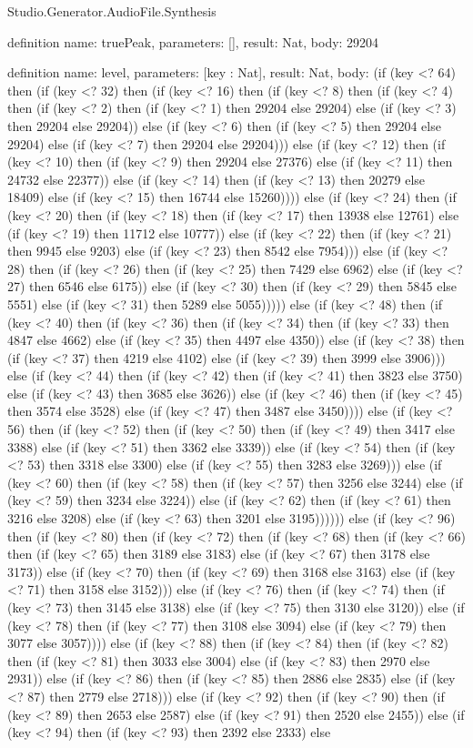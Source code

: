 \begin{lexlean}{Studio.Generator.AudioFile.Synthesis}
\begin{semanticmodule}
definition{
  name: truePeak,
  parameters: [],
  result: Nat,
  body: 29204
}

definition{
  name: level,
  parameters: [key : Nat],
  result: Nat,
  body: (if (key <? 64) then (if (key <? 32) then (if (key <? 16) then (if (key <? 8) then (if (key <? 4) then (if (key <? 2) then (if (key <? 1) then 29204 else 29204) else (if (key <? 3) then 29204 else 29204)) else (if (key <? 6) then (if (key <? 5) then 29204 else 29204) else (if (key <? 7) then 29204 else 29204))) else (if (key <? 12) then (if (key <? 10) then (if (key <? 9) then 29204 else 27376) else (if (key <? 11) then 24732 else 22377)) else (if (key <? 14) then (if (key <? 13) then 20279 else 18409) else (if (key <? 15) then 16744 else 15260)))) else (if (key <? 24) then (if (key <? 20) then (if (key <? 18) then (if (key <? 17) then 13938 else 12761) else (if (key <? 19) then 11712 else 10777)) else (if (key <? 22) then (if (key <? 21) then 9945 else 9203) else (if (key <? 23) then 8542 else 7954))) else (if (key <? 28) then (if (key <? 26) then (if (key <? 25) then 7429 else 6962) else (if (key <? 27) then 6546 else 6175)) else (if (key <? 30) then (if (key <? 29) then 5845 else 5551) else (if (key <? 31) then 5289 else 5055))))) else (if (key <? 48) then (if (key <? 40) then (if (key <? 36) then (if (key <? 34) then (if (key <? 33) then 4847 else 4662) else (if (key <? 35) then 4497 else 4350)) else (if (key <? 38) then (if (key <? 37) then 4219 else 4102) else (if (key <? 39) then 3999 else 3906))) else (if (key <? 44) then (if (key <? 42) then (if (key <? 41) then 3823 else 3750) else (if (key <? 43) then 3685 else 3626)) else (if (key <? 46) then (if (key <? 45) then 3574 else 3528) else (if (key <? 47) then 3487 else 3450)))) else (if (key <? 56) then (if (key <? 52) then (if (key <? 50) then (if (key <? 49) then 3417 else 3388) else (if (key <? 51) then 3362 else 3339)) else (if (key <? 54) then (if (key <? 53) then 3318 else 3300) else (if (key <? 55) then 3283 else 3269))) else (if (key <? 60) then (if (key <? 58) then (if (key <? 57) then 3256 else 3244) else (if (key <? 59) then 3234 else 3224)) else (if (key <? 62) then (if (key <? 61) then 3216 else 3208) else (if (key <? 63) then 3201 else 3195)))))) else (if (key <? 96) then (if (key <? 80) then (if (key <? 72) then (if (key <? 68) then (if (key <? 66) then (if (key <? 65) then 3189 else 3183) else (if (key <? 67) then 3178 else 3173)) else (if (key <? 70) then (if (key <? 69) then 3168 else 3163) else (if (key <? 71) then 3158 else 3152))) else (if (key <? 76) then (if (key <? 74) then (if (key <? 73) then 3145 else 3138) else (if (key <? 75) then 3130 else 3120)) else (if (key <? 78) then (if (key <? 77) then 3108 else 3094) else (if (key <? 79) then 3077 else 3057)))) else (if (key <? 88) then (if (key <? 84) then (if (key <? 82) then (if (key <? 81) then 3033 else 3004) else (if (key <? 83) then 2970 else 2931)) else (if (key <? 86) then (if (key <? 85) then 2886 else 2835) else (if (key <? 87) then 2779 else 2718))) else (if (key <? 92) then (if (key <? 90) then (if (key <? 89) then 2653 else 2587) else (if (key <? 91) then 2520 else 2455)) else (if (key <? 94) then (if (key <? 93) then 2392 else 2333) else }
\end{semanticmodule}
\end{lexlean}
